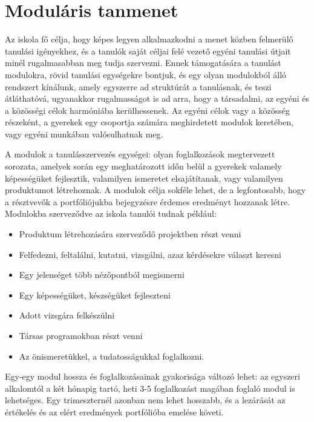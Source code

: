 \section{Moduláris tanmenet}

Az iskola fő célja, hogy képes legyen alkalmazkodni a menet közben felmerülő tanulási igényekhez, és a tanulók saját céljai felé vezető egyéni tanulási útjait minél rugalmasabban meg tudja szervezni. Ennek támogatására a tanulást modulokra, rövid tanulási egységekre bontjuk, és egy olyan modulokból álló rendszert kínálunk, amely egyszerre ad struktúrát a tanulásnak, és teszi átláthatóvá, ugyanakkor rugalmasságot is ad arra, hogy a társadalmi, az egyéni és a közösségi célok harmóniába kerülhessenek. Az egyéni célok vagy a közösség részeként, a gyerekek egy csoportja számára meghirdetett modulok keretében, vagy egyéni munkában valósulhatnak meg.

A modulok a tanulásszervezés egységei: olyan foglalkozások megtervezett sorozata, amelyek során egy meghatározott időn belül a gyerekek valamely képességüket fejlesztik, valamilyen ismeretet elsajátítanak, vagy valamilyen produktumot létrehoznak. A modulok célja sokféle lehet, de a legfontosabb, hogy a résztvevők a portfóliójukba bejegyzésre érdemes eredményt hozzanak létre. Modulokba szerveződve az iskola tanulói tudnak például:
\begin{itemize}
\item Produktum létrehozására szerveződő projektben részt venni

\item Felfedezni, feltalálni, kutatni, vizsgálni, azaz kérdésekre választ keresni

\item Egy jelenséget több nézőpontból megismerni

\item Egy képességüket, készségüket fejleszteni

\item Adott vizsgára felkészülni

\item Társas programokban részt venni

\item Az önismeretükkel, a tudatosságukkal foglalkozni.
\end{itemize}

Egy-egy modul hossza és foglalkozásainak gyakorisága változó lehet: az egyszeri alkalomtól a két hónapig tartó, heti 3-5 foglalkozást magában foglaló modul is lehetséges. Egy trimeszternél azonban nem lehet hosszabb, és a lezárását az értékelés és az elért eredmények portfólióba emelése követi.


